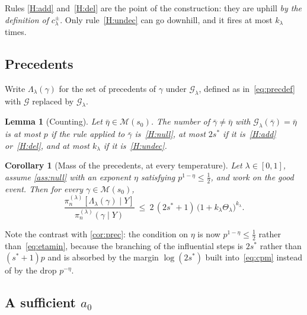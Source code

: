 \documentclass[aos]{imsart}
\theoremstyle{plain}
\newtheorem{lemma}{Lemma}[section]
\newtheorem{corollary}{Corollary}[section]
\theoremstyle{definition}
\begin{document}
    Rules \ref{H:add} and~\ref{H:del} are the point of the construction: they
    are uphill \emph{by the definition of} $c^{\pm}_\lambda$. Only
    rule~\ref{H:undec} can
    go downhill, and it fires at most $k_\lambda$ times.

    \subsection{Precedents}
    \label{sub:precG}

    Write $\Lambda_\lambda(\gamma)$ for the set of precedents of $\gamma$
    under $\mathcal{G}_\lambda$, defined as in~\eqref{eq:precdef} with
    $\mathcal{G}$ replaced by $\mathcal{G}_\lambda$.

    \begin{lemma}[Counting]
        \label{lemma:countG}
        Let $\bar\eta\in\mathscr{M}(s_0)$. The number of $\bar\gamma\neq
        \bar\eta$ with $\mathcal{G}_\lambda(\bar\gamma)=\bar\eta$ is at most
        $p$ if the rule applied to $\bar\gamma$ is~\ref{H:null}, at most
        $2s^{\ast}$ if it is~\ref{H:add} or~\ref{H:del}, and at most
        $k_\lambda$ if it is~\ref{H:undec}.
    \end{lemma}


    \begin{corollary}[Mass of the precedents, at every temperature]
        \label{cor:precG}
        Let $\lambda\in[0,1]$, assume \cref{ass:null} with an exponent $\eta$
        satisfying $p^{1-\eta}\leq\tfrac12$, and work on the good event. Then
        for every $\gamma\in\mathscr{M}(s_0)$,
        \begin{equation}
            \label{eq:precmassG}
            \frac{\pi_n^{(\lambda)}[\Lambda_\lambda(\gamma)\mid Y]}
            {\pi_n^{(\lambda)}(\gamma\mid Y)}
            \ \leq\ 2\,(2s^{\ast}+1)\,
            \bigl(1+k_\lambda\Theta_\lambda\bigr)^{k_\lambda} .
        \end{equation}
    \end{corollary}


    Note the contrast with \cref{cor:prec}: the condition on $\eta$ is now
    $p^{1-\eta}\leq\tfrac12$ rather than~\eqref{eq:etamin}, because the
    branching of the influential steps is $2s^{\ast}$ rather than
    $(s^{\ast}+1)p$ and is absorbed by the margin $\log(2s^{\ast})$ built
    into~\eqref{eq:cpm} instead of by the drop $p^{-\eta}$.

    \subsection{A sufficient $a_0$}
    \label{sub:a0}
\end{document}
